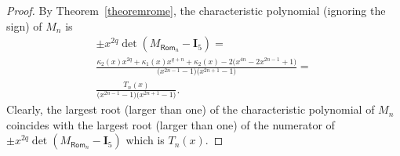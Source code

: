 \documentclass[a4paper, 11pt]{amsart}
\numberwithin{equation}{section}
\theoremstyle{customnumberedtheorem}
\theoremstyle{definitionwithbfnote}
\begin{document}
\begin{proof}
By Theorem~\ref{theoremrome}, the characteristic polynomial
(ignoring the sign) of $M_n$ is
\begin{multline*}
  \pm x^{2q}\det(M_{\textsf{Rom}_n} - \mathbf{I}_{5})  =\\
  \frac{
    \kappa_2(x) x^{2q} +  \kappa_1(x) x^{q+n} + \kappa_2(x) - 2\bigl(x^{4n} - 2x^{2n-1} + 1\bigr)
  }{\bigl(x^{2n-1}-1\bigr)\bigl(x^{2n+1}-1\bigl)} = \\
  \frac{T_n(x)}{\bigl(x^{2n-1}-1\bigr)\bigl(x^{2n+1}-1\bigl)} .
\end{multline*}
Clearly, the largest root (larger than one) of
the characteristic polynomial of $M_n$ coincides with
the largest root (larger than one) of the numerator of
$\pm x^{2q}\det(M_{\textsf{Rom}_n} - \mathbf{I}_{5})$ which is $T_n(x).$
\end{proof}
\end{document}
